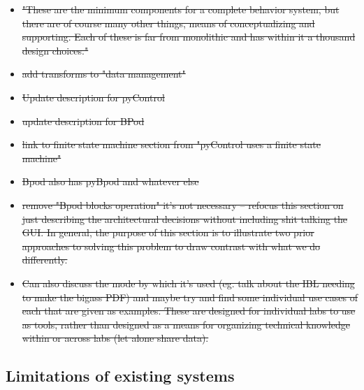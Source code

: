 \begin{itemize}
	\item \sout{"These are the minimum components for a complete behavior system, but there are of course many other things, means of conceptualizing and supporting. Each of these is far from monolithic and has within it a thousand design choices."}
	\item \sout{add transforms to "data management"}
	\item \sout{Update description for pyControl}
	\item \sout{update description for BPod}
	\item \sout{link to finite state machine section from "pyControl uses a finite state machine"}
	\item \sout{Bpod also has pyBpod and whatever else}
	\item \sout{remove "Bpod blocks operation" it's not necessary -- refocus this section on just describing the architectural decisions without including shit talking the GUI. In general, the purpose of this section is to illustrate two prior approaches to solving this problem to draw contrast with what we do differently.}
	\item \sout{Can also discuss the mode by which it's used (eg. talk about the IBL needing to make the bigass PDF) and maybe try and find some individual use cases of each that are given as examples. These are designed for individual labs to use as tools, rather than designed as a means for organizing technical knowledge within or across labs (let alone share data).}
\end{itemize}

\subsection{Limitations of existing systems}

